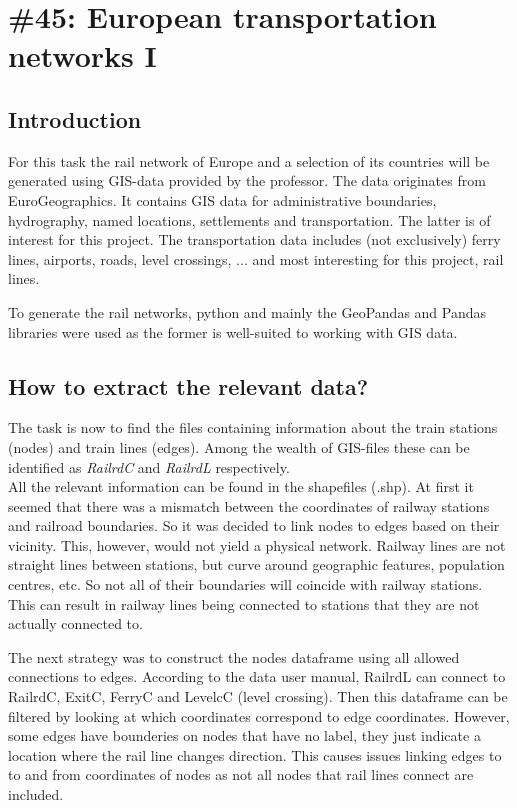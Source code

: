 \chapter{\#45: European transportation networks I}


\section{Introduction}
 
For this task the rail network of Europe and a selection of its countries will be generated using GIS-data provided by the professor. The data originates from EuroGeographics. It contains GIS data for administrative boundaries, hydrography, named locations, settlements and transportation. The latter is of interest for this project. The transportation data includes (not exclusively) ferry lines, airports, roads, level crossings, ... and most interesting for this project, rail lines.

To generate the rail networks, python and mainly the GeoPandas and Pandas libraries were used as the former is well-suited to working with GIS data.

\section{How to extract the relevant data?}

The task is now to find the files containing information about the train stations (nodes) and train lines (edges). Among the wealth of GIS-files these can be identified as \textit{RailrdC} and \textit{RailrdL} respectively.\\

All the relevant information can be found in the shapefiles (.shp). At first it seemed that there was a mismatch between the coordinates of railway stations and railroad boundaries. So it was decided to link nodes to edges based on their vicinity. This, however, would not yield a physical network. Railway lines are not straight lines between stations, but curve around geographic features, population centres, etc. So not all of their boundaries will coincide with railway stations. This can result in railway lines being connected to stations that they are not actually connected to.

The next strategy was to construct the nodes dataframe using all allowed connections to edges. According to the data user manual, RailrdL can connect to RailrdC, ExitC, FerryC and LevelcC (level crossing). Then this dataframe can be filtered by looking at which coordinates correspond to edge coordinates. However, some edges have bounderies on nodes that have no label, they just indicate a location where the rail line changes direction. This causes issues linking edges to to and from coordinates of nodes as not all nodes that rail lines connect are included.

